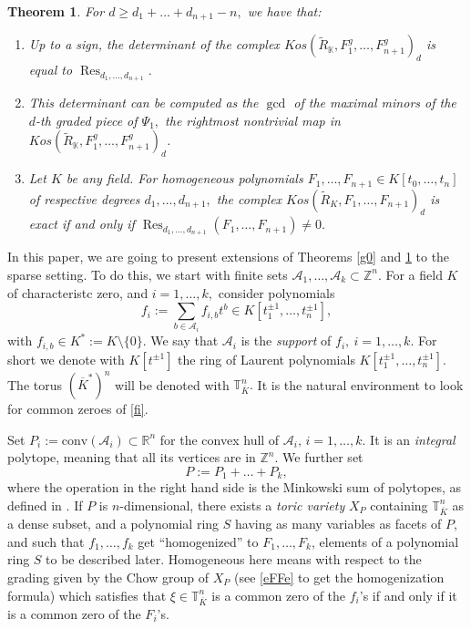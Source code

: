 \documentclass[a4paper,11pt]{amsart}
\newcommand{\Res}{\operatorname{Res}}
\newcommand{\K}{\mathbb{K}}
\newcommand{\R}{\mathbb{R}}
\newcommand{\T}{\mathbb{T}}
\newcommand{\Z}{\mathbb{Z}}
\newcommand{\cA}{{\mathcal A}}
\newcounter{thm}
\numberwithin{thm}{section}
\numberwithin{equation}{section}
\theoremstyle{definition}
\theoremstyle{plain}
\newtheorem{theorem}[thm]{Theorem}
\begin{document}
\begin{theorem}\label{chom}
For  $d\geq d_1+\ldots+d_{n+1}-n,$ we have that:
\begin{enumerate}
\item Up to a sign,  the determinant of the complex $Kos(\tilde{R}_\K,F^g_1,\ldots, F^g_{n+1})_d$ is equal to $\Res_{d_1,\ldots, d_{n+1}}.$
\item This determinant can be computed as the $\gcd$ of the maximal minors of the $d$-th graded piece of $\Psi_{1},$  the rightmost nontrivial map in $Kos(\tilde{R}_\K,F^g_1,\ldots, F^g_{n+1})_d$.
\item Let $K$ be any field. For homogeneous polynomials $F_1,\ldots, F_{n+1}\in K[t_0,\ldots, t_n]$ of respective degrees $d_1,\ldots, d_{n+1},$ the complex $Kos(\tilde{R}_K,F_1,\ldots, F_{n+1})_d$ is exact if and only if $\Res_{d_1,\ldots, d_{n+1}}(F_1,\ldots, F_{n+1})\neq0.$
\end{enumerate}
\end{theorem}



In this paper, we are going to present extensions of Theorems \ref{g0} and \ref{chom} to the sparse setting.
To do this, we start with finite sets $\cA_1,\ldots, \cA_{k}\subset\Z^n.$  For a field $K$ of characteristc zero, and  $i=1,\ldots, k,$ consider polynomials
\begin{equation}\label{fi}
f_i:=\sum_{b\in\cA_i} f_{i,b} t^b \in K[t_1^{\pm1},\ldots, t_n^{\pm1}],
\end{equation}
with $f_{i,b}\in K^*:=K\setminus\{0\}.$ We say that $\cA_i$ is the {\em support} of $f_i, \ i=1,\ldots, k.$ For short we denote with $K[t^{\pm1}]$ the ring of Laurent polynomials $K[t_1^{\pm1},\ldots, t_n^{\pm1}].$ The torus $(\overline{K}^*)^n$ will be denoted with $\T_{\overline{K}}^n.$ It is the natural environment to look for common zeroes of  \eqref{fi}.

Set $P_i:=\mbox{conv}(\cA_i)\subset\R^n$ for the convex hull of $\cA_i,\, i=1,\ldots, k.$  It is an {\em integral} polytope, meaning that all its vertices are in $\Z^n.$ We further set
\begin{equation}\label{pp}
P:=P_1+\ldots + P_k,
\end{equation}
where the operation in the right hand side is the Minkowski sum of polytopes, as defined in \cite[Chapter 7]{CLO05}.
If $P$ is $n$-dimensional, there exists a \textit{toric variety} $X_P$ containing $\T_{\overline{K}}^n$ as a dense subset, and a polynomial ring $S$ having as many variables as facets of $P,$ and such that  $f_1,\ldots, f_k$ get ``homogenized'' to $F_1,\ldots, F_k$, elements of a polynomial ring $S$ to be described later.  Homogeneous here means with respect to the grading given by the Chow group of $X_P$  (see \eqref{eFFe} to get the homogenization formula) which satisfies that $\xi\in\T_{\overline{K}}^n$ is a common zero of the $f_i$'s if and only if it is  a common zero of the $F_i$'s.
\end{document}
